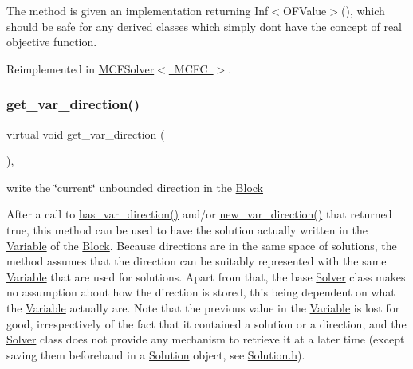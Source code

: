 The method is given an implementation returning Inf$<$\+O\+F\+Value$>$(), which should be safe for any derived classes which simply don\textquotesingle{}t have the concept of real objective function. 

Reimplemented in \mbox{\hyperlink{class_s_m_spp__di__unipi__it_1_1_m_c_f_solver_a106686dbd21fcdd86e42130d39a7ec2f}{M\+C\+F\+Solver$<$ M\+C\+F\+C $>$}}.

\mbox{\label{class_s_m_spp__di__unipi__it_1_1_solver_a4bc119810c0c2ee3ba0c48183f50aaf4}} 
\subsubsection{\texorpdfstring{get\+\_\+var\+\_\+direction()}{get\_var\_direction()}}
{\footnotesize\ttfamily virtual void get\+\_\+var\+\_\+direction (\begin{DoxyParamCaption}\item[{void}]{ }\end{DoxyParamCaption})\hspace{0.3cm}{\ttfamily [inline]}, {\ttfamily [virtual]}}



write the \char`\"{}current\char`\"{} unbounded direction in the \mbox{\hyperlink{class_s_m_spp__di__unipi__it_1_1_block}{Block}} 

After a call to \mbox{\hyperlink{class_s_m_spp__di__unipi__it_1_1_solver_a27e8c876f577289e523ebf26aeeb977a}{has\+\_\+var\+\_\+direction()}} and/or \mbox{\hyperlink{class_s_m_spp__di__unipi__it_1_1_solver_a673fc1c81a1fc86e55dfab3a37f303bc}{new\+\_\+var\+\_\+direction()}} that returned true, this method can be used to have the solution actually written in the \mbox{\hyperlink{class_s_m_spp__di__unipi__it_1_1_variable}{Variable}} of the \mbox{\hyperlink{class_s_m_spp__di__unipi__it_1_1_block}{Block}}. Because directions are in the same space of solutions, the method assumes that the direction can be suitably represented with the same \mbox{\hyperlink{class_s_m_spp__di__unipi__it_1_1_variable}{Variable}} that are used for solutions. Apart from that, the base \mbox{\hyperlink{class_s_m_spp__di__unipi__it_1_1_solver}{Solver}} class makes no assumption about how the direction is stored, this being dependent on what the \mbox{\hyperlink{class_s_m_spp__di__unipi__it_1_1_variable}{Variable}} actually are. Note that the previous value in the \mbox{\hyperlink{class_s_m_spp__di__unipi__it_1_1_variable}{Variable}} is lost for good, irrespectively of the fact that it contained a solution or a direction, and the \mbox{\hyperlink{class_s_m_spp__di__unipi__it_1_1_solver}{Solver}} class does not provide any mechanism to retrieve it at a later time (except saving them beforehand in a \mbox{\hyperlink{class_s_m_spp__di__unipi__it_1_1_solution}{Solution}} object, see \mbox{\hyperlink{_solution_8h}{Solution.\+h}}).

